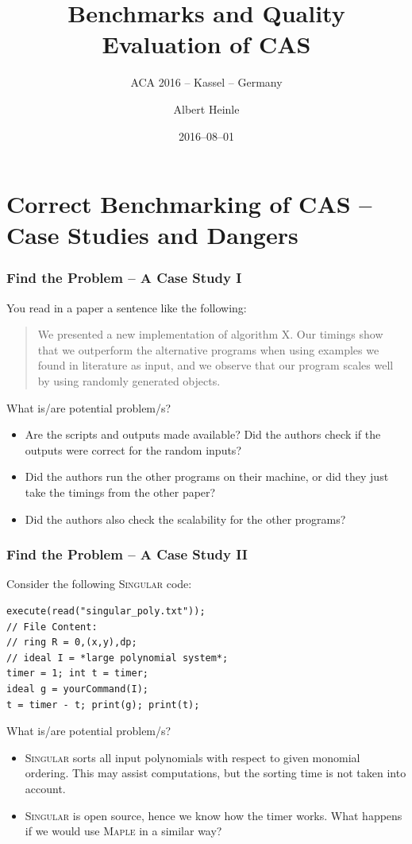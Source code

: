 \documentclass{beamer}
\title{Benchmarks and Quality Evaluation of CAS}
\subtitle{ACA 2016 -- Kassel -- Germany}
\author{Albert Heinle}
\institute{Symbolic Computation Group\\
David R. Cheriton School of Computer Science\\
University of Waterloo\\Canada}
\date{2016--08--01}
\begin{document}
\frame
{
  \titlepage
}

\frame
{
  \tableofcontents
}

\section{Correct Benchmarking of CAS -- Case Studies and Dangers}

\frame
{
    \begin{center}
      {\Huge{\insertsection}}
    \end{center}
}

\begin{frame}
  \frametitle{Find the Problem -- A Case Study I}
  You read in a paper a sentence like the following:
  \begin{quote}
    We presented a new implementation of algorithm
    X. Our timings show that we outperform the alternative programs when using examples we
    found in literature as
    input, and we observe that our program scales well by using
    randomly generated objects.
  \end{quote}
What is/are potential problem/s?
\pause
\begin{itemize}
\item Are the scripts and outputs made available? Did the authors
  check if the outputs were correct for the random inputs?
\item Did the authors run the other programs on their machine, or
  did they just take the timings from the other paper?
\item Did the authors also check the scalability for the other programs?
\end{itemize}
\end{frame}

\begin{frame}[fragile]
  \frametitle{Find the Problem -- A Case Study II}
  Consider the following \textsc{Singular} code:
{\footnotesize{\begin{verbatim}
execute(read("singular_poly.txt"));
// File Content:
// ring R = 0,(x,y),dp;
// ideal I = *large polynomial system*;
timer = 1; int t = timer;
ideal g = yourCommand(I);
t = timer - t; print(g); print(t);
\end{verbatim}}}
What is/are potential problem/s?
\pause
\begin{itemize}
\item \textsc{Singular} sorts all input polynomials with respect to
  given monomial ordering. This may assist computations, but the
  sorting time is not taken into account.
\item \textsc{Singular} is open source, hence we know how the timer
  works. What happens if we would use \textsc{Maple} in a similar way?
\end{itemize}
\end{frame}
\end{document}
